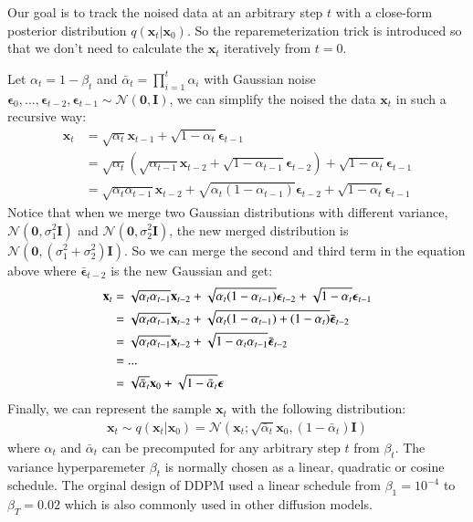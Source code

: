 \documentclass[12pt,DIV14,BCOR12mm,a4paper,footinclude=false,headinclude,parskip=half-,twoside,openright,cleardoublepage=empty,toc=index,bibliography=totoc,listof=totoc]{scrreprt}
\numberwithin{equation}{chapter}
\begin{document}
Our goal is to track the noised data at an arbitrary step $t$ with a close-form posterior distribution $q(\mathbf{x}_{t}|\mathbf{x}_{0})$. So the reparemeterization trick is introduced so that we don't need to calculate the $\mathbf{x}_{t}$ iteratively from $t=0$.

Let $\alpha_{t} = 1 - \beta_{t}$ and $\bar{\alpha}_{t} = \prod_{i=1}^{t}\alpha_{i}$ with Gaussian noise $\boldsymbol{\epsilon}_{0},...,\boldsymbol{\epsilon}_{t-2},\boldsymbol{\epsilon}_{t-1} \sim \mathcal{N}(\mathbf{0}, \mathbf{I})$, we can simplify the noised the data $\mathbf{x}_{t}$ in such a recursive way:
\begin{align*}
  \mathbf{x}_{t} &= \sqrt{\alpha_{t}}\mathbf{x}_{t-1} + \sqrt{1-\alpha_{t}}\boldsymbol{\epsilon}_{t-1}\\
                 &= \sqrt{\alpha_{t}}(\sqrt{\alpha_{t-1}}\mathbf{x}_{t-2} + \sqrt{1-\alpha_{t-1}}\boldsymbol{\epsilon}_{t-2}) + \sqrt{1-\alpha_{t}}\boldsymbol{\epsilon}_{t-1}\\
                 &= \sqrt{\alpha_{t}\alpha_{t-1}}\mathbf{x}_{t-2} + \sqrt{\alpha_{t}(1-\alpha_{t-1})}\boldsymbol{\epsilon}_{t-2} + \sqrt{1-\alpha_{t}}\boldsymbol{\epsilon}_{t-1}
\end{align*}
Notice that when we merge two Gaussian distributions with different variance, $\mathcal{N} (\mathbf{0}, \sigma^{2}_{1}\mathbf{I})$ and $\mathcal{N} (\mathbf{0}, \sigma^{2}_{2}\mathbf{I})$, the new merged distribution is $\mathcal{N} (\mathbf{0}, (\sigma^{2}_{1} + \sigma^{2}_{2})\mathbf{I})$. So we can merge the second and third term in the equation above where $\bar{\boldsymbol{\epsilon}}_{t-2}$ is the new Gaussian and get:
\begin{align}\label{eq:xt_x0}
  \mathbf{x}_{t} &= \sqrt{\alpha_{t}\alpha_{t-1}}\mathbf{x}_{t-2} + \sqrt{\alpha_{t}(1-\alpha_{t-1})}\boldsymbol{\epsilon}_{t-2} + \sqrt{1-\alpha_{t}}\boldsymbol{\epsilon}_{t-1}\notag\\
                 &= \sqrt{\alpha_{t}\alpha_{t-1}}\mathbf{x}_{t-2} + \sqrt{\alpha_{t}(1-\alpha_{t-1}) + (1-\alpha_{t})}\bar{\boldsymbol{\epsilon}}_{t-2}\notag\\
                 &= \sqrt{\alpha_{t}\alpha_{t-1}}\mathbf{x}_{t-2} + \sqrt{1-\alpha_{t}\alpha_{t-1}}\bar{\boldsymbol{\epsilon}}_{t-2}\notag\\
                 &=...\notag\\
                 &= \sqrt{\bar{\alpha}_{t}}\mathbf{x}_{0} + \sqrt{1-\bar{\alpha}_{t}}\boldsymbol{\epsilon} 
\end{align}
Finally, we can represent the sample $\mathbf{x}_{t}$ with the following distribution:
\begin{align}
  \mathbf{x}_{t} \sim q(\mathbf{x}_{t}|\mathbf{x}_{0}) = \mathcal{N}(\mathbf{x}_{t}; \sqrt{\bar{\alpha}_{t}}\mathbf{x}_{0}, (1-\bar{\alpha}_{t})\mathbf{I})
\end{align}
where $\alpha_{t}$ and $\bar{\alpha}_{t}$ can be precomputed for any arbitrary step $t$ from $\beta_{t}$. The variance hyperparemeter $\beta_{t}$ is normally chosen as a linear, quadratic or cosine schedule. The orginal design of DDPM used a linear schedule from $\beta_{1} = 10^{-4}$ to $\beta_{T} = 0.02$ which is also commonly used in other diffusion models.
\end{document}
